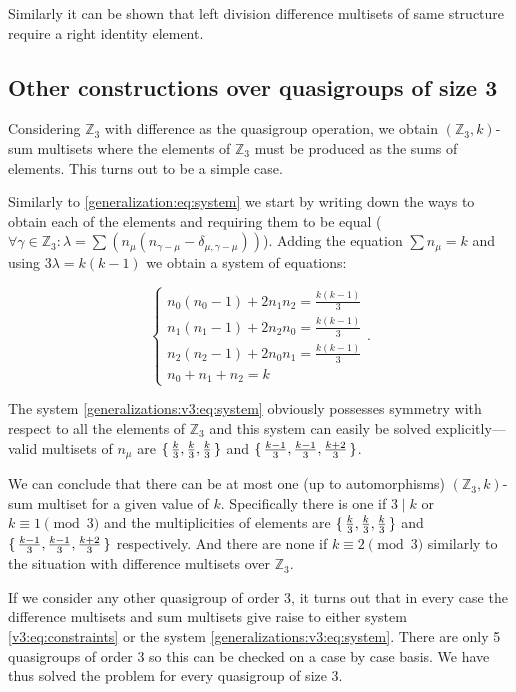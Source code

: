     Similarly it can be shown that left division difference multisets of same structure require a right identity element.

\subsection{Other constructions over quasigroups of size 3}
    \label{sec:v3}
    Considering $\mathbb Z_3$ with difference as the quasigroup operation, we obtain $(\mathbb Z_3,k)$-sum multisets where the elements of $\mathbb Z_3$ must be produced as the sums of elements. This turns out to be a simple case.

    Similarly to \eqref{generalization:eq:system} we start by writing down the ways to obtain each of the elements and requiring them to be equal ($\forall \gamma \in \mathbb Z_3 \colon  \lambda = \sum (n_\mu (n_{\gamma-\mu}-\delta_{\mu,\gamma-\mu}))$). Adding the equation $\sum n_\mu = k$ and using $3\lambda = k(k-1)$ we obtain a system of equations:
    
    \begin{equation}
        \label{generalizations:v3:eq:system}
        \begin{cases}
            n_0 (n_0-1) + 2 n_1 n_2 = \frac{k(k-1)}{3} \\
            n_1 (n_1-1) + 2 n_2 n_0 = \frac{k(k-1)}{3} \\
            n_2 (n_2-1) + 2 n_0 n_1 = \frac{k(k-1)}{3} \\
            n_0 + n_1 + n_2 = k
        \end{cases}.
    \end{equation}

    The system \eqref{generalizations:v3:eq:system} obviously possesses symmetry with respect to all the elements of $\mathbb Z_3$ and this system can easily be solved explicitly---valid multisets of $n_\mu$ are $\set{\frac k 3, \frac k 3, \frac k 3}$ and $\set{\frac{k-1}{3}, \frac{k-1}{3}, \frac{k+2}{3}}$.
    
    We can conclude that there can be at most one (up to automorphisms) $(\mathbb Z_3, k)$-sum multiset for a given value of $k$. Specifically there is one if $3 \mid k$ or $k \equiv 1 \pmod 3$ and the multiplicities of elements are $\set{\frac k 3, \frac k 3, \frac k 3}$ and $\set{\frac{k-1}{3}, \frac{k-1}{3}, \frac{k+2}{3}}$ respectively. And there are none if $k \equiv 2 \pmod 3$ similarly to the situation with difference multisets over $\mathbb Z_3$.
    
    If we consider any other quasigroup of order 3, it turns out that in every case the difference multisets and sum multisets give raise to either system \eqref{v3:eq:constraints} or the system \eqref{generalizations:v3:eq:system}. There are only 5 quasigroups of order 3 so this can be checked on a case by case basis. We have thus solved the problem for every quasigroup of size 3.
    
